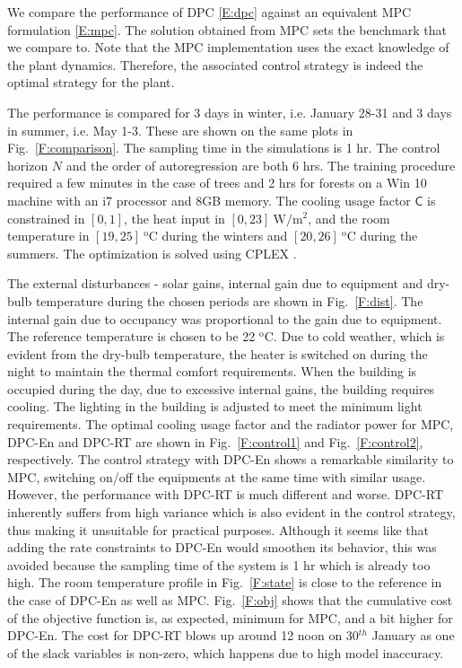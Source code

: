 We compare the performance of DPC \eqref{E:dpc} against an equivalent MPC formulation \eqref{E:mpc}. The solution obtained from MPC sets the benchmark that we compare to. Note that the MPC implementation uses the exact knowledge of the plant dynamics. Therefore, the associated control strategy is indeed the optimal strategy for the plant.

The performance is compared for 3 days in winter, i.e. January 28-31 and 3 days in summer, i.e. May 1-3. These are shown on the same plots in Fig.~\ref{F:comparison}.
The sampling time in the simulations is 1 hr. The control horizon $N$ and the order of autoregression are both 6 hrs. The training procedure required a few minutes in the case of trees and 2 hrs for forests on a Win 10 machine with an i7 processor and 8GB memory.
The cooling usage factor $\mathsf{C}$ is constrained in $[0,1]$, the heat input in $[0,23]\ \mathrm{W/m^2}$, and the room temperature in $[19,25]\ \mathrm{^oC}$ during the winters and $[20,26]\ \mathrm{^oC}$ during the summers.
The optimization is solved using CPLEX \cite{IBM}.

The external disturbances - solar gains, internal gain due to equipment and dry-bulb temperature during the chosen periods are shown in Fig.~\ref{F:dist}. The internal gain due to occupancy was proportional to the gain due to equipment. 
The reference temperature is chosen to be 22 $\mathrm{^oC}$. Due to cold weather, which is evident from the dry-bulb temperature, the heater is switched on during the night to maintain the thermal comfort requirements. When the building is occupied during the day, due to excessive internal gains, the building requires cooling. The lighting in the building is adjusted to meet the minimum light requirements.
The optimal cooling usage factor and the radiator power for MPC, DPC-En and DPC-RT are shown in Fig.~\ref{F:control1} and Fig.~\ref{F:control2}, respectively. The control strategy with DPC-En shows a remarkable similarity to MPC, switching on/off the equipments at the same time with similar usage. However, the performance with DPC-RT is much different and worse. DPC-RT inherently suffers from high variance which is also evident in the control strategy, thus making it unsuitable for practical purposes. 
Although it seems like that adding the rate constraints to DPC-En would smoothen its behavior, this was avoided because the sampling time of the system is 1 hr which is already too high. The room temperature profile in Fig.~\ref{F:state} is close to the reference in the case of DPC-En as well as MPC. 
Fig.~\ref{F:obj} shows that the cumulative cost of the objective function is, as expected, minimum for MPC, and a bit higher for DPC-En. The cost for DPC-RT blows up around 12 noon on 30$^{th}$ January as one of the slack variables is non-zero, which happens due to high model inaccuracy.

